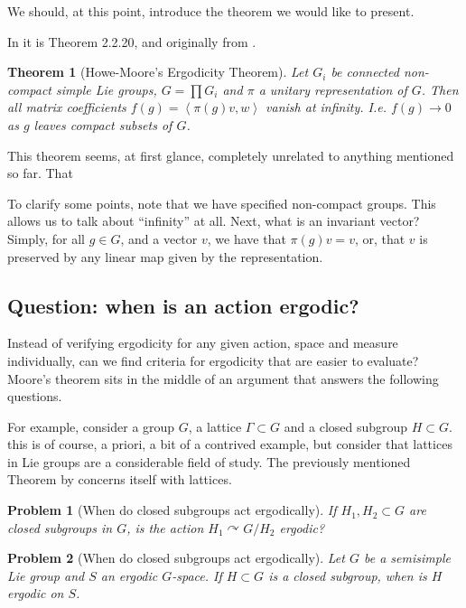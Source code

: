 \documentclass[
  12pt
]{article}
\newtheorem{thm}{Theorem}[section]
\newtheorem*{problem}{Problem}
\theoremstyle{plain}
\newcommand{\G}{\ensuremath{G}\xspace}
\newcommand{\inn}[1]{\left\langle #1 \right\rangle}
\begin{document}
  We should, at this point, introduce the theorem we would like to present.

  In \citeauthor{Zimmer84}\cite{Zimmer84} it is Theorem 2.2.20, and originally from \citeauthor{howe79}\cite{howe79}.

  \begin{thm}[Howe-Moore's Ergodicity Theorem]
    \label{thm:main-thm}
    Let $G_i$ be connected non-compact simple Lie groups, $G = \prod G_i$ and
    $\pi$ a unitary representation of \G. Then all matrix coefficients $f(g) =
    \inn{\pi(g)v,w}$ vanish at infinity. I.e. $f(g) \rightarrow 0$ as $g$
    leaves compact subsets of \G.
  \end{thm}

  This theorem seems, at first glance, completely unrelated to anything mentioned so far.
  That 

  To clarify some points, note that we have specified non-compact groups.
  This allows us to talk about ``infinity'' at all. Next, what is an
  invariant vector? Simply, for all $g\in G$, and a vector $v$, we
  have that $\pi(g)v = v$, or, that $v$ is preserved by any linear map
  given by the representation.

  \hypertarget{question-when-is-an-action-ergodic}{%
  \subsection{Question: when is an action
  ergodic?}\label{question-when-is-an-action-ergodic}}

  Instead of verifying ergodicity for any given action, space and measure
  individually, can we find criteria for ergodicity that are easier to
  evaluate? Moore's theorem sits in the middle of an argument that
  answers the following questions.

  For example, consider a group \G, a lattice $\Gamma \subset G$ and a closed subgroup $H \subset G$.
  this is of course, a priori, a bit of a contrived example, but consider that lattices in Lie groups are a considerable field of study.
  The previously mentioned Theorem by \citeauthor{margulis91}\cite{margulis91} concerns itself with lattices.


  \begin{problem}[When do closed subgroups act ergodically]
    If $H_1, H_2 \subset G$ are closed subgroups in \G, is the action $H_1\curvearrowright G/H_2$ ergodic?
  \end{problem}

  \begin{problem}[When do closed subgroups act ergodically]
    Let \G be a semisimple Lie group and $S$ an ergodic \G-space. If $H\subset G$ is a closed subgroup, when is $H$ ergodic on $S$.
  \end{problem}
\end{document}
